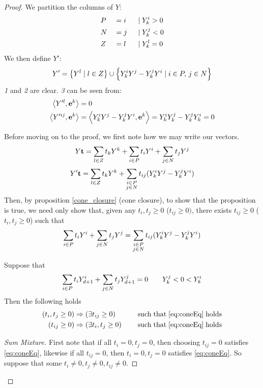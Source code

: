 \begin{proof}
	We partition the columns of $ Y$:
	\begin{alignat*}{3}
		 & P &  & = i \; & \;|\; & Y^i_{k} > 0 \\
		 & N &  & = j \; & \;|\; & Y^j_{k} < 0 \\
		 & Z &  & = l \; & \;|\; & Y^l_{k} = 0
	\end{alignat*}
	We then define $ Y'$:
	\[  Y' = \left\{ Y^l \;|\; l \in Z\right\} \cup
		\left\{Y^i_{k} Y^j - Y^j_{k} Y^i \;|\; i \in P,\, j\in N\right\} \]
	\textit{1} and \textit{2} are clear.  \textit{3} can be seen from:
	\begin{align}
		\left\langle Y'^l, \mathbf{e}^k \right\rangle    & = 0 \nonumber                                                                \\
		\left\langle Y'^{ij}, \mathbf{e}^k \right\rangle & = \left\langle Y^i_{k} Y^j - Y^j_{k} Y^i, \mathbf{e}^k \right\rangle = Y^i_{k} Y^j_{k} - Y^j_{k} Y^i_{k} = 0 \label{eq:hdropZrows}
	\end{align}

	Before moving on to the proof, we first note how we may write our vectors.
	\[  Y\mathbf{t} = \sum_{l\in Z} t_k  Y^k + \sum_{i\in P} t_i  Y^i + \sum_{j\in N} t_j  Y^j \]
	\[  Y'\mathbf{t} = \sum_{l\in Z} t_k  Y^k + \sum_{\substack{i\in P \\ j\in N}} t_{ij} (Y^i_{k} Y^j - Y^j_{k} Y^i) \]
	Then, by proposition \ref{cone_closure} (cone closure), to show that the proposition is true, we need only show that, given any $t_i, t_j \geq 0$ ($t_{ij} \geq 0)$, there exists $t_{ij} \geq 0$ ($t_i, t_j \geq 0$) such that
	\begin{equation} \label{eq:coneEq}
		\sum_{i\in P} t_i  Y^i + \sum_{j\in N} t_j  Y^j = \sum_{\substack{i\in P \\ j\in N}} t_{ij} (Y^i_{k} Y^j - Y^j_{k} Y^i)
	\end{equation}

	\newcommand{\coneEqSat}{\quad\mathrm{\;such\; that\; \eqref{eq:coneEq}\; holds}}
	\begin{Prop}
		Suppose that
		\[ \sum_{i\in P} t_i  Y^i_{d+1} + \sum_{j\in N} t_j  Y^j_{d+1} = 0\quad\quad Y^j_{k} < 0 < Y^i_{k} \]
		Then the following holds
		\begin{alignat*}{2}
			(t_i, t_j \geq 0) & \Rightarrow (\exists t_{ij} \geq 0)   &  & \coneEqSat \\
			(t_{ij} \geq 0)   & \Rightarrow (\exists t_i, t_j \geq 0) &  & \coneEqSat
		\end{alignat*}
	\end{Prop}

	\begin{proof}[Sum Mixture]
		First note that if all $t_i = 0,t_j = 0$, then choosing $t_{ij} = 0$ satisfies \eqref{eq:coneEq}, likewise if all $t_{ij} = 0$, then $t_i = 0, t_j = 0$ satisfies \eqref{eq:coneEq}.  So suppose that some $t_i \neq 0, t_j \neq 0, t_{ij} \neq 0$.


\end{proof}
\end{proof}
